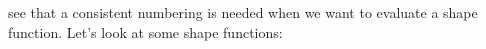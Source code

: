 \documentclass[a4paper,12pt]{article}
\begin{document}
see that a consistent numbering is needed when we want to evaluate a shape function. Let's look at some shape functions:
\end{document}
